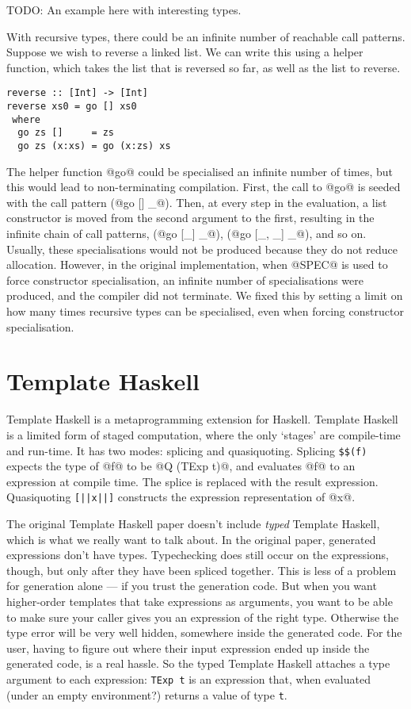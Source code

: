 TODO: An example here with interesting types.

With recursive types, there could be an infinite number of reachable call patterns.
Suppose we wish to reverse a linked list.
We can write this using a helper function, which takes the list that is reversed so far, as well as the list to reverse.

\begin{lstlisting}
reverse :: [Int] -> [Int]
reverse xs0 = go [] xs0
 where
  go zs []     = zs
  go zs (x:xs) = go (x:zs) xs
\end{lstlisting}

The helper function @go@ could be specialised an infinite number of times, but this would lead to non-terminating compilation.
First, the call to @go@ is seeded with the call pattern (@go [] _@).
Then, at every step in the evaluation, a list constructor is moved from the second argument to the first, resulting in the infinite chain of call patterns, (@go [_] _@), (@go [_, _] _@), and so on.
Usually, these specialisations would not be produced because they do not reduce allocation.
However, in the original implementation, when @SPEC@ is used to force constructor specialisation, an infinite number of specialisations were produced, and the compiler did not terminate.
We fixed this by setting a limit on how many times recursive types can be specialised, even when forcing constructor specialisation.


\section{Template Haskell}
Template Haskell is a metaprogramming extension for Haskell.
Template Haskell is a limited form of staged computation, where the only `stages' are compile-time and run-time.
It has two modes: splicing and quasiquoting.
Splicing \verb/$$(f)/ expects the type of @f@ to be @Q (TExp t)@, and evaluates @f@ to an expression at compile time.
The splice is replaced with the result expression.
Quasiquoting \lstinline/[||x||]/ constructs the expression representation of @x@.

The original Template Haskell paper \cite{sheard2002template} doesn't include \emph{typed} Template Haskell, which is what we really want to talk about.
In the original paper, generated expressions don't have types.
Typechecking does still occur on the expressions, though, but only after they have been spliced together.
This is less of a problem for generation alone --- if you trust the generation code.
But when you want higher-order templates that take expressions as arguments, you want to be able to make sure your caller gives you an expression of the right type.
Otherwise the type error will be very well hidden, somewhere inside the generated code.
For the user, having to figure out where their input expression ended up inside the generated code, is a real hassle.
So the typed Template Haskell attaches a type argument to each expression: \lstinline|TExp t| is an expression that, when evaluated (under an empty environment?) returns a value of type \lstinline|t|.

